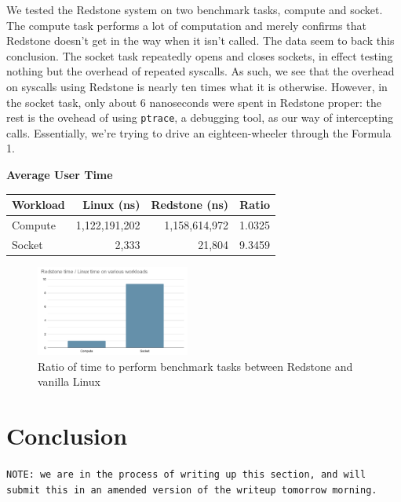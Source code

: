 {\fontsize{12}{15}\selectfont 
We tested the Redstone system on two benchmark tasks,
compute and socket.
The compute task performs a lot of computation and merely confirms that Redstone doesn't get in the way when it isn't called.
The data seem to back this conclusion.
The socket task repeatedly opens and closes sockets,
in effect testing nothing but the overhead of repeated syscalls.
As such, we see that the overhead on syscalls using Redstone is nearly ten times what it is otherwise.
However, in the socket task, only about 6 nanoseconds were spent in Redstone proper:
the rest is the ovehead of using \texttt{ptrace}, a debugging tool,
as our way of intercepting calls.
Essentially, we're trying to drive an eighteen-wheeler through the Formula 1.

\textbf{Average User Time}
\begin{tabular}{|l|r r| r|}
\hline
Workload & Linux (ns) &  Redstone (ns) & Ratio \\
\hline
Compute & 1,122,191,202 & 1,158,614,972 & 1.0325 \\
Socket  & 2,333 & 21,804 & 9.3459 \\
\hline
\end{tabular}

\begin{figure}[h]
\includegraphics[width=0.45\textwidth]{redstone_performance.png}
\caption{Ratio of time to perform benchmark tasks between Redstone and vanilla Linux}
\end{figure}

}

\section{\txtrsdust Conclusion}

{\fontsize{12}{15}\selectfont 
\texttt{NOTE: we are in the process of writing up this section, and will submit this in an amended version of the writeup tomorrow morning.}


}

